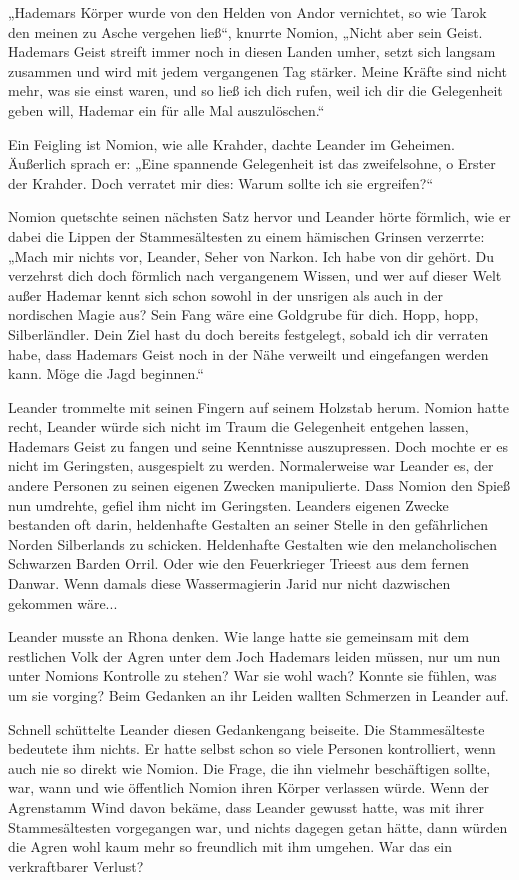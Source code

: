 „Hademars Körper wurde von den Helden von Andor vernichtet, so wie Tarok den meinen zu Asche vergehen ließ“, knurrte Nomion, „Nicht aber sein Geist. Hademars Geist streift immer noch in diesen Landen umher, setzt sich langsam zusammen und wird mit jedem vergangenen Tag stärker. Meine Kräfte sind nicht mehr, was sie einst waren, und so ließ ich dich rufen, weil ich dir die Gelegenheit geben will, Hademar ein für alle Mal auszulöschen.“

Ein Feigling ist Nomion, wie alle Krahder, dachte Leander im Geheimen. Äußerlich sprach er: „Eine spannende Gelegenheit ist das zweifelsohne, o Erster der Krahder. Doch verratet mir dies: Warum sollte ich sie ergreifen?“

Nomion quetschte seinen nächsten Satz hervor und Leander hörte förmlich, wie er dabei die Lippen der Stammesältesten zu einem hämischen Grinsen verzerrte: „Mach mir nichts vor, Leander, Seher von Narkon. Ich habe von dir gehört. Du verzehrst dich doch förmlich nach vergangenem Wissen, und wer auf dieser Welt außer Hademar kennt sich schon sowohl in der unsrigen als auch in der nordischen Magie aus? Sein Fang wäre eine Goldgrube für dich. Hopp, hopp, Silberländler. Dein Ziel hast du doch bereits festgelegt, sobald ich dir verraten habe, dass Hademars Geist noch in der Nähe verweilt und eingefangen werden kann. Möge die Jagd beginnen.“

Leander trommelte mit seinen Fingern auf seinem Holzstab herum. Nomion hatte recht, Leander würde sich nicht im Traum die Gelegenheit entgehen lassen, Hademars Geist zu fangen und seine Kenntnisse auszupressen. Doch mochte er es nicht im Geringsten, ausgespielt zu werden. Normalerweise war Leander es, der andere Personen zu seinen eigenen Zwecken manipulierte. Dass Nomion den Spieß nun umdrehte, gefiel ihm nicht im Geringsten. Leanders eigenen Zwecke bestanden oft darin, heldenhafte Gestalten an seiner Stelle in den gefährlichen Norden Silberlands zu schicken. Heldenhafte Gestalten wie den melancholischen Schwarzen Barden Orril. Oder wie den Feuerkrieger Trieest aus dem fernen Danwar. Wenn damals diese Wassermagierin Jarid nur nicht dazwischen gekommen wäre...

Leander musste an Rhona denken. Wie lange hatte sie gemeinsam mit dem restlichen Volk der Agren unter dem Joch Hademars leiden müssen, nur um nun unter Nomions Kontrolle zu stehen? War sie wohl wach? Konnte sie fühlen, was um sie vorging? Beim Gedanken an ihr Leiden wallten Schmerzen in Leander auf.

Schnell schüttelte Leander diesen Gedankengang beiseite. Die Stammesälteste bedeutete ihm nichts. Er hatte selbst schon so viele Personen kontrolliert, wenn auch nie so direkt wie Nomion. Die Frage, die ihn vielmehr beschäftigen sollte, war, wann und wie öffentlich Nomion ihren Körper verlassen würde. Wenn der Agrenstamm Wind davon bekäme, dass Leander gewusst hatte, was mit ihrer Stammesältesten vorgegangen war, und nichts dagegen getan hätte, dann würden die Agren wohl kaum mehr so freundlich mit ihm umgehen. War das ein verkraftbarer Verlust?

